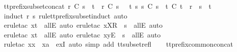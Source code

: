 \begin{isabellebody}
\endisatagproof
{\isafoldproof}%
%
\isadelimproof
\isanewline
%
\endisadelimproof
\isanewline
{}\isamarkupfalse%
\ tt{\isacharunderscore}prefix{\isacharunderscore}subset{\isacharunderscore}concat{}{\isacharcolon}\ {\isachardoublequoteopen}r\ {\isasymlesssim}\isactrlsub C\ s\ {\isacharat}\ t\ {\isasymLongrightarrow}\ r\ {\isasymlesssim}\isactrlsub C\ s\ {\isasymor}\ {\isacharparenleft}{\isasymexists}\ t{\isacharprime}\ s{\isacharprime}{\isachardot}\ s{\isacharprime}\ {\isasymsubseteq}\isactrlsub C\ s\ {\isasymand}\ t{\isacharprime}\ {\isasymlesssim}\isactrlsub C\ t\ {\isasymand}\ r\ {\isacharequal}\ s{\isacharprime}\ {\isacharat}\ t{\isacharprime}{\isacharparenright}{\isachardoublequoteclose}\isanewline
%
\isadelimproof
\ \ %
\endisadelimproof
%
\isatagproof
{}\isamarkupfalse%
\ {\isacharparenleft}induct\ r\ s\ rule{\isacharcolon}tt{\isacharunderscore}prefix{\isacharunderscore}subset{\isachardot}induct{\isacharcomma}\ auto{\isacharparenright}\isanewline
\ \ \isamarkupfalse%
\ {\isacharparenleft}erule{\isacharunderscore}tac\ x{\isacharequal}{\isachardoublequoteopen}t{\isacharprime}{\isachardoublequoteclose}\ \ allE{\isacharcomma}\ auto{\isacharcomma}\ erule{\isacharunderscore}tac\ x{\isacharequal}{\isachardoublequoteopen}{\isacharbrackleft}X{\isacharbrackright}\isactrlsub R\ {\isacharhash}\ s{\isacharprime}{\isachardoublequoteclose}\ \ allE{\isacharcomma}\ auto{\isacharparenright}\isanewline
\ \ \isamarkupfalse%
\ {\isacharparenleft}erule{\isacharunderscore}tac\ x{\isacharequal}{\isachardoublequoteopen}t{\isacharprime}{\isachardoublequoteclose}\ \ allE{\isacharcomma}\ auto{\isacharcomma}\ erule{\isacharunderscore}tac\ x{\isacharequal}{\isachardoublequoteopen}{\isacharbrackleft}y{\isacharbrackright}\isactrlsub E\ {\isacharhash}\ s{\isacharprime}{\isachardoublequoteclose}\ \ allE{\isacharcomma}\ auto{\isacharparenright}\isanewline
\ \ \isamarkupfalse%
\ {\isacharparenleft}rule{\isacharunderscore}tac\ x{\isacharequal}{\isachardoublequoteopen}x\ {\isacharhash}\ xa{\isachardoublequoteclose}\ \ exI{\isacharcomma}\ auto\ simp\ add{\isacharcolon}\ tt{\isacharunderscore}subset{\isacharunderscore}refl{\isacharparenright}\isanewline
\ \ \isamarkupfalse%
%
\endisatagproof
{\isafoldproof}%
%
\isadelimproof
\isanewline
%
\endisadelimproof
\isanewline
{}\isamarkupfalse%
\ tt{\isacharunderscore}prefix{\isacharunderscore}common{\isacharunderscore}concat{\isacharcolon}\isanewline

\end{isabellebody}
